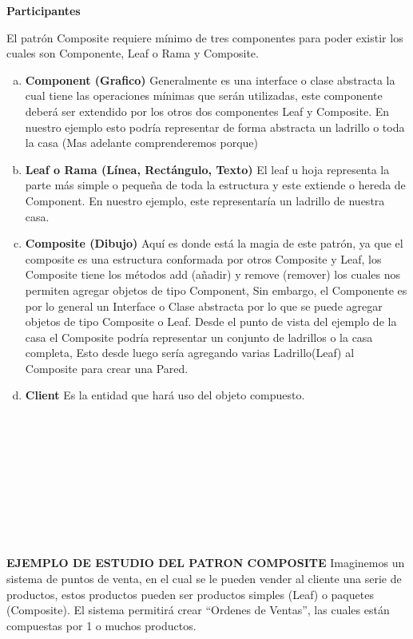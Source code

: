 \begin{flushleft}
\textbf{Participantes}

El patrón Composite requiere mínimo de tres componentes para poder existir los cuales son Componente, Leaf o Rama y Composite.

\begin{enumerate}[a)]
        \item \textbf{ Component (Grafico)}
Generalmente es una interface o clase abstracta la cual tiene las operaciones mínimas que serán utilizadas, este componente deberá ser extendido por los otros dos componentes Leaf y Composite. En nuestro ejemplo esto podría representar de forma abstracta un ladrillo o toda la casa (Mas adelante comprenderemos porque)

        \item \textbf{ Leaf o Rama (Línea, Rectángulo, Texto)}
El leaf u hoja representa la parte más simple o pequeña de toda la estructura y este extiende o hereda de Component. En nuestro ejemplo, este representaría un ladrillo de nuestra casa.

	\item \textbf{Composite (Dibujo)}
Aquí es donde está la magia de este patrón, ya que el composite es una estructura conformada por otros Composite y Leaf, los Composite tiene los métodos add  (añadir) y remove (remover) los cuales nos permiten agregar objetos de tipo Component, Sin embargo, el Componente es por lo general un Interface o Clase abstracta  por lo que se puede agregar objetos de tipo Composite o Leaf.   Desde el punto de vista del ejemplo de la casa el Composite podría representar un conjunto de ladrillos o la casa completa, Esto desde luego sería agregando varias Ladrillo(Leaf) al Composite para crear una Pared.

	\item \textbf{ Client}
Es la entidad que hará uso del objeto compuesto.
    \end{enumerate}

\textbf{}\\ 
\textbf{}\\ 
\textbf{}\\ 
\textbf{}\\ 
\textbf{}\\ 
\textbf{}\\ 
\textbf{}\\ 
\textbf{}\\ 
\textbf{}\\ 
\textbf{EJEMPLO DE ESTUDIO DEL PATRON COMPOSITE}
Imaginemos un sistema de puntos de venta, en el cual se le pueden vender al cliente una serie de productos, estos productos pueden ser productos simples (Leaf) o paquetes (Composite).  El sistema permitirá crear “Ordenes de Ventas”, las cuales están compuestas por 1 o muchos productos.


\end{flushleft}
